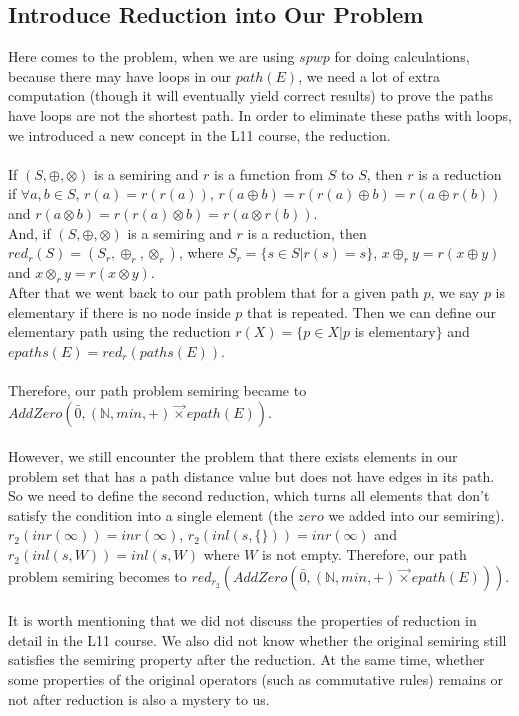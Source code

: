 \documentclass[a4paper,10pt]{article}
\begin{document}
\subsection{Introduce Reduction into Our Problem}
Here comes to the problem, when we are using $spwp$ for doing calculations, because there may have loops in our $path(E)$, we need a lot of extra computation (though it will eventually yield correct results) to prove the paths have loops are not the shortest path.
In order to eliminate these paths with loops, we introduced a new concept in the L11 course, the reduction.\\\\
If $(S,\oplus,\otimes)$ is a semiring and $r$ is a function from $S$ to $S$, then $r$ is a reduction if $\forall a,b \in S$, $r(a) = r(r(a))$, $r(a\oplus b) = r(r(a)\oplus b) = r(a\oplus r(b))$ and 
$r(a\otimes b) = r(r(a)\otimes b) = r(a\otimes r(b))$.\\
And, if $(S,\oplus,\otimes)$ is a semiring and $r$ is a reduction, then $red_r(S) = (S_r,\oplus_r,\otimes_r)$, where $S_r = \{s\in S|r(s)= s\}$, $x\oplus_r y = r(x\oplus y)$ and $x\otimes_r y = r(x\otimes y)$.\\
After that we went back to our path problem that for a given path $p$, we say $p$ is elementary if there is no node inside $p$ that is repeated. Then we can define our elementary path using the reduction $r(X) = \{p\in X | p $ is elementary$\} $ and $epaths(E) = red_r(paths(E))$.\\\\
Therefore, our path problem semiring became to $AddZero(\bar0,(\mathbb{N},min,+) \overrightarrow{\times} epath(E))$.\\\\
However, we still encounter the problem that there exists elements in our problem set that has a path distance value but does not have edges in its path. So we need to define the second reduction, which turns all elements that don't satisfy the condition into a single element (the $zero$ we added into our semiring).\\
$r_2 (inr(\infty)) = inr(\infty)$, $r_2 (inl(s,\{\})) = inr(\infty)$ and $r_2 (inl(s,W)) = inl(s,W)$ where $W$ is not empty.
Therefore, our path problem semiring becomes to $red_{r_2}(AddZero(\bar0,(\mathbb{N},min,+) \overrightarrow{\times} epath(E)))$.\\\\
It is worth mentioning that we did not discuss the properties of reduction in detail in the L11 course. We also did not know whether the original semiring still satisfies the semiring property after the reduction. At the same time, whether some properties of the original operators (such as commutative rules) remains or not after reduction is also a mystery to us.\\
\end{document}
